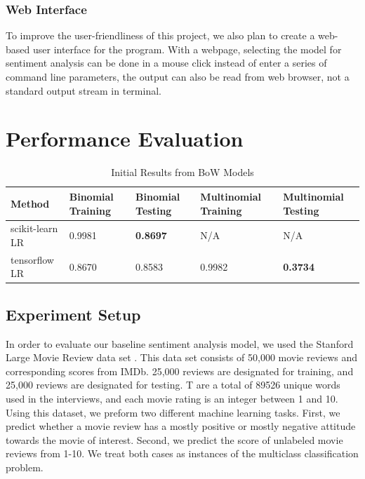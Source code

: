 \documentclass[conference]{IEEEtran}
\begin{document}
\subsubsection{Web Interface}
\label{model:stretch:web}
    To improve the user-friendliness of this project, we also plan to create a 
    web-based user interface for the program. With a webpage, selecting
    the model for sentiment analysis can be done in a mouse click instead of 
    enter a series of command line parameters, the output can also
    be read from web browser, not a standard output stream in terminal. 

\section{Performance Evaluation}
\label{performance}
    \begin{table}[]
        \centering
        \caption{Initial Results from BoW Models}
        \label{my-label}
        \begin{tabularx}{\textwidth}{ X  X  X X  X }
        \toprule
        Method & Binomial Training & Binomial Testing & Multinomial Training & Multinomial Testing \\
        \midrule
        scikit-learn LR & 0.9981 & \textbf{0.8697} & N/A & N/A \\
        tensorflow LR & 0.8670 & 0.8583 & 0.9982 & \textbf{0.3734} \\
        \bottomrule
        \end{tabularx}
    \end{table}
\subsection{Experiment Setup}
    In order to evaluate our baseline sentiment analysis model, we used the
    Stanford Large Movie Review data set \cite{maas2011learning}. This data
    set consists of 50,000 movie reviews and corresponding scores from IMDb.
    25,000 reviews are designated for training, and 25,000 reviews are designated for testing.
    T are a total of 89526 unique words used in the interviews, and each
    movie rating is an integer between 1 and 10. Using this dataset, we preform
    two different machine learning tasks. First, we predict whether a movie review
    has a mostly positive or mostly negative attitude towards the movie of interest. 
    Second, we predict the score of unlabeled movie reviews from 1-10. We treat
    both cases as instances of the multiclass classification problem.
    
\end{document}
